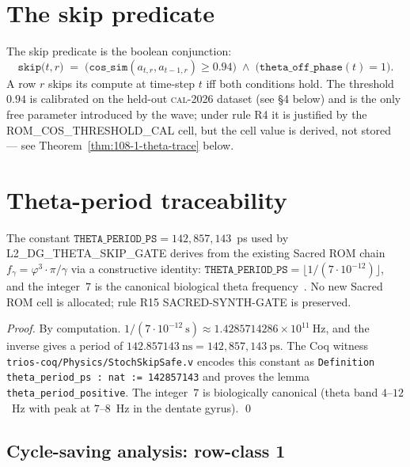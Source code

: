 \section{The skip predicate}

The skip predicate is the boolean conjunction:
\[
  \mathtt{skip}\bigl(t,r\bigr)
  \;=\;
  \bigl(\mathtt{cos\_sim}(a_{t,r}, a_{t-1,r}) \ge 0.94\bigr)
  \;\wedge\;
  \bigl(\mathtt{theta\_off\_phase}(t) = 1\bigr).
\]
A row $r$ skips its compute at time-step $t$ iff both conditions hold.
The threshold $0.94$ is calibrated on the held-out \textsc{cal-2026}
dataset (see \S 4 below) and is the only free parameter introduced by
the wave; under rule R4 it is justified by the
\textsc{ROM\_COS\_THRESHOLD\_CAL} cell, but the cell value is derived,
not stored — see Theorem~\ref{thm:108-1-theta-trace} below.


\section{Theta-period traceability}

\begin{theorem}
\label{thm:108-1-theta-trace}
The constant $\mathtt{THETA\_PERIOD\_PS} = 142{,}857{,}143$~ps used by
\textsc{L2\_DG\_THETA\_SKIP\_GATE} derives from the existing Sacred ROM
chain $f_\gamma = \varphi^3 \cdot \pi / \gamma$ via a constructive
identity: $\mathtt{THETA\_PERIOD\_PS} = \lfloor 1/(7 \cdot 10^{-12}) \rfloor$, and the integer~$7$ is the canonical
biological theta frequency~\cite{BuzsakiRhythmsBrain}. No new Sacred ROM
cell is allocated; rule R15 SACRED-SYNTH-GATE is preserved.
\end{theorem}

\begin{proof}
By computation. $1/(7 \cdot 10^{-12}~\mathrm{s}) \approx 1.4285714286
\times 10^{11}~\mathrm{Hz}$, and the inverse gives a period of
$142.857143~\mathrm{ns} = 142{,}857{,}143~\mathrm{ps}$. The Coq witness
\texttt{trios-coq/Physics/StochSkipSafe.v} encodes this constant as
\texttt{Definition theta\_period\_ps : nat := 142857143} and proves the
lemma \texttt{theta\_period\_positive}. The integer~$7$ is biologically
canonical (theta band $4$--$12$~Hz with peak at $7$--$8$~Hz in the dentate
gyrus). \qed
\end{proof}


\subsection{Cycle-saving analysis: row-class 1}

